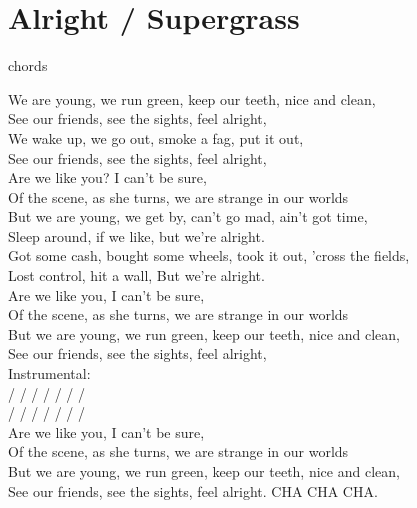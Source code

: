 \section{Alright / Supergrass}\label{sec:alright}
  {\small chords}
  
  \Eminor
  \FsharpMinor
  \Fmajor
  \Amajor
  \Gmajor
  
  We are young, we run green, keep our teeth, nice and clean,\\
  See our friends, see the sights, feel alright,\\
  We wake up, we go out, smoke a fag, put it out,\\
  See our friends, see the sights, feel alright,\\
  Are we like you? I can't be sure,\\
  Of the scene, as she turns, we are strange in our worlds\\
  But we are young, we get by, can't go mad, ain't got time,\\
  Sleep around, if we like, but we're alright.\\
  Got some cash, bought some wheels, took it out, 'cross the fields,\\
  Lost control, hit a wall, But we're alright.\\
  Are we like you, I can't be sure,\\
  Of the scene, as she turns, we are strange in our worlds\\
  But we are young, we run green, keep our teeth, nice and clean,\\
  See our friends, see the sights, feel alright,\\
  Instrumental:\\
   /  /  /  /  /  /  / \\
   /  /  /  /  /  /  / \\
  Are we like you, I can't be sure,\\
  Of the scene, as she turns, we are strange in our worlds\\
  But we are young, we run green, keep our teeth, nice and clean,\\
  See our friends, see the sights, feel alright. CHA CHA CHA.\\
